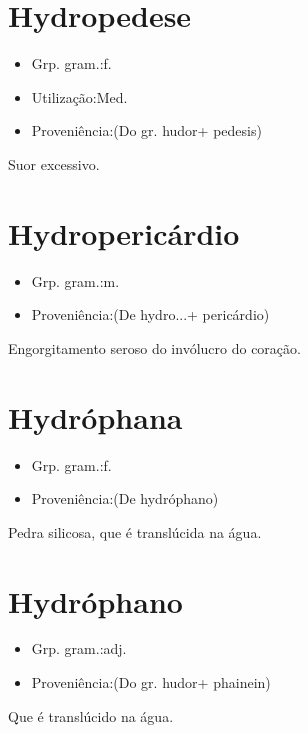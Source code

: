 \documentclass{article}
\begin{document}
\section{Hydropedese}
\begin{itemize}
\item {Grp. gram.:f.}
\end{itemize}
\begin{itemize}
\item {Utilização:Med.}
\end{itemize}
\begin{itemize}
\item {Proveniência:(Do gr. \textunderscore hudor\textunderscore  + \textunderscore pedesis\textunderscore )}
\end{itemize}
Suor excessivo.
\section{Hydropericárdio}
\begin{itemize}
\item {Grp. gram.:m.}
\end{itemize}
\begin{itemize}
\item {Proveniência:(De \textunderscore hydro...\textunderscore  + \textunderscore pericárdio\textunderscore )}
\end{itemize}
Engorgitamento seroso do invólucro do coração.
\section{Hydróphana}
\begin{itemize}
\item {Grp. gram.:f.}
\end{itemize}
\begin{itemize}
\item {Proveniência:(De \textunderscore hydróphano\textunderscore )}
\end{itemize}
Pedra silicosa, que é translúcida na água.
\section{Hydróphano}
\begin{itemize}
\item {Grp. gram.:adj.}
\end{itemize}
\begin{itemize}
\item {Proveniência:(Do gr. \textunderscore hudor\textunderscore  + \textunderscore phainein\textunderscore )}
\end{itemize}
Que é translúcido na água.
\end{document}

